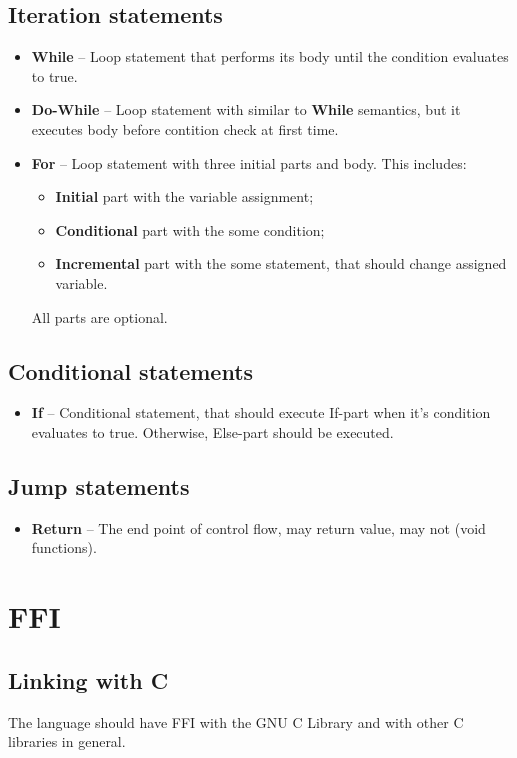\documentclass{article}
\begin{document}
		\subsection{Iteration statements}
			\begin{itemize}
		  		\item \textbf{While} -- Loop statement that performs its body until the
		  			condition evaluates to true.
		  		
		  		\item \textbf{Do-While} -- Loop statement with similar to \textbf{While}
		  			semantics, but it executes body before contition check at first time.
		  			
	  			\item \textbf{For} -- Loop statement with three initial parts and body.
	  				This includes:
	  				\begin{itemize}
	  					\item \textbf{Initial} part with the variable assignment;
	  					\item \textbf{Conditional} part with the some condition;
	  					\item \textbf{Incremental} part with the some statement, that
	  						should change assigned variable.
	  				\end{itemize}
	  				
	  				All parts are optional.
			\end{itemize}
			
		\subsection{Conditional statements}
			\begin{itemize}
				\item \textbf{If} -- Conditional statement, that should execute
				If-part when it's condition evaluates to true. Otherwise, Else-part
				should be executed. 
			\end{itemize}
			
		\subsection{Jump statements}
			\begin{itemize}
				\item \textbf{Return} -- The end point of control flow, may return
				value, may not (void functions).
			\end{itemize}
			
	\section{FFI}
		\subsection{Linking with C}
			The language should have FFI with the GNU C Library and with other C
			libraries in general.
\end{document}
